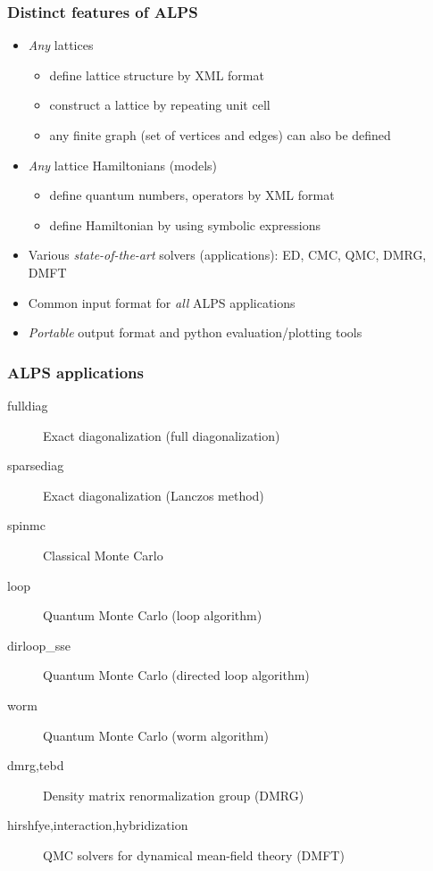\begin{frame}[t,fragile]
  \frametitle{Distinct features of ALPS}
  \begin{itemize}
  \item {\em \color{red} Any} lattices
    \begin{itemize}
    \item define lattice structure by XML format
    \item construct a lattice by repeating unit cell
    \item any finite graph (set of vertices and edges) can also be defined
    \end{itemize}
  \item {\em \color{red} Any} lattice Hamiltonians (models)
    \begin{itemize}
    \item define quantum numbers, operators by XML format
    \item define Hamiltonian by using symbolic expressions
    \end{itemize}
  \item Various {\em \color{red} state-of-the-art} solvers (applications): ED, CMC, QMC, DMRG, DMFT
  \item Common input format for {\em \color{red} all} ALPS applications
  \item {\em \color{red} Portable} output format and python evaluation/plotting tools
  \end{itemize}
\end{frame}

\begin{frame}[t,fragile]
  \frametitle{ALPS applications}
  \begin{description}
  \item[fulldiag] Exact diagonalization (full diagonalization)
  \item[sparsediag] Exact diagonalization (Lanczos method)
  \item[spinmc] Classical Monte Carlo
  \item[loop] Quantum Monte Carlo (loop algorithm)
  \item[dirloop\_sse] Quantum Monte Carlo (directed loop algorithm)
  \item[worm] Quantum Monte Carlo (worm algorithm)
  \item[dmrg,tebd] Density matrix renormalization group (DMRG)
  \item[hirshfye,interaction,hybridization] QMC solvers for dynamical mean-field theory (DMFT)
  \end{description}
\end{frame}

